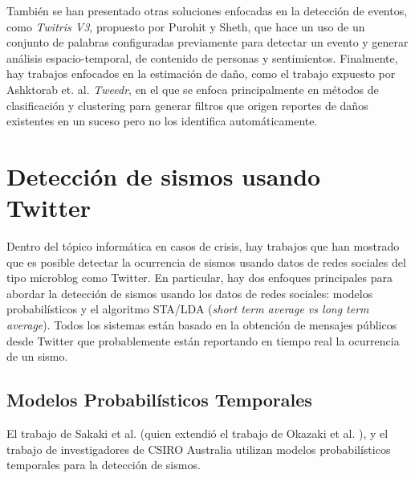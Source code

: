 También se han presentado otras soluciones enfocadas en la detección de eventos, como {\em Twitris V3}\cite{purohit2013twitris}, propuesto por Purohit y Sheth, que hace un uso de un conjunto de palabras configuradas previamente para detectar un evento y generar análisis espacio-temporal, de contenido de personas y sentimientos. Finalmente, hay trabajos enfocados en la estimación de daño, como el trabajo expuesto por Ashktorab et. al. \textit{Tweedr}\cite{ashktorab2014tweedr}, en el que se enfoca principalmente en métodos de clasificación y clustering para generar filtros que origen reportes de daños existentes en un suceso pero no los identifica automáticamente.

\section{Detección de sismos usando Twitter}
\label{sec:deteccionsismos}

Dentro del tópico informática en casos de crisis, hay trabajos que han mostrado que es posible detectar la ocurrencia de sismos usando datos de redes sociales del tipo microblog como Twitter. 
%
En particular, hay dos enfoques principales para abordar la detección de sismos usando los datos de redes sociales: modelos probabilísticos y el algoritmo STA/LDA ({\em short term average vs long term average}). Todos los sistemas están basado en la obtención de mensajes públicos desde Twitter que probablemente están reportando en tiempo real la ocurrencia de un sismo. 

 
\subsection{Modelos Probabilísticos Temporales}
\label{sec:modelosprob}

El trabajo de Sakaki et al. \cite{sakaki2013tweet,sakaki2010earthquake} (quien extendió el trabajo de Okazaki et al. \cite{okazaki2010semantic}), y el trabajo de investigadores de CSIRO Australia \cite{yin2012using,robinson2013sensitive} utilizan modelos probabilísticos temporales para la detección de sismos. 

